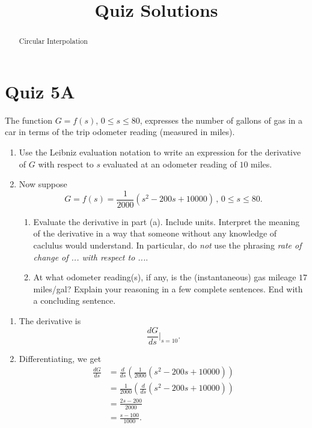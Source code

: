 \documentclass{ximera}
\title{Quiz Solutions}
\begin{document}
\begin{abstract}
Circular Interpolation
\end{abstract}
\maketitle


\section{Quiz 5A}

\begin{question} \label{QQuiz5A}

The function $G=f(s)$, $0\leq s \leq 80$, expresses the number of gallons of gas in a car in terms of the trip odometer reading (measured in miles). 

\begin{enumerate}
\item Use the Leibniz evaluation notation to write an expression for the derivative of $G$ with respect to $s$ evaluated at an odometer reading of $10$ miles.

\item Now suppose
\[
    G = f(s) = \frac{1}{2000}\left( s^2 - 200s + 10000  \right) \, , \, 0\leq s \leq 80.
\]

\begin{enumerate}
\item Evaluate the derivative in part (a). Include units. Interpret the meaning of the derivative in a way that someone without any knowledge of caclulus would understand. In particular, do \emph{not} use the phrasing \emph{rate of change of ... with respect to ...}.

\item At what odometer reading(s), if any, is the (instantaneous) gas mileage $17$ miles/gal? Explain your reasoning in a few complete sentences. End with a concluding sentence.
\end{enumerate}
\end{enumerate}

\begin{explanation}

\begin{enumerate}
\item The derivative is
\[
      \frac{dG}{ds}\Big|_{s=10} .
\]

\item Differentiating, we get
\begin{align*}
 \frac{dG}{ds}  &= \frac{d}{ds}\left( \frac{1}{2000}\left( s^2 - 200s + 10000  \right) \right) \\
                        &= \frac{1}{2000} \left( \frac{d}{ds}  \left( s^2 - 200s + 10000  \right)  \right) \\
                        &=\frac{2s-200}{2000} \\
                       &=\frac{s-100}{1000} .
\end{align*}


\end{enumerate}
\end{explanation}
\end{question}
\end{document}
